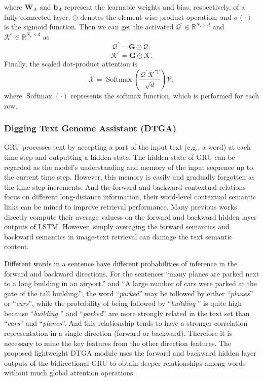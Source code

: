 \documentclass[journal]{IEEEtran}
\begin{document}
where $\bm{W}_A $ and $\bm{b}_A$ represent the learnable weights and bias, respectively, of a fully-connected layer; $\odot$ denotes the element-wise product operation; and $\sigma \left(\cdot \right)$ is the sigmoid function. Then we can get the activated $\bm{\mathcal{Q}}^{\prime} \in \mathbb{R}^{N_c \times d}$ and $\bm{\mathcal{K}}^{\prime} \in \mathbb{R}^{N_c \times d}$ as
\begin{equation}
\bm{\mathcal{Q}}^{\prime}=\bm{G} \odot \bm{\mathcal{Q}},
\end{equation}
\begin{equation}
\bm{\mathcal{K}}^{\prime}= \bm{G} \odot \bm{\mathcal{K}}.
\end{equation}
Finally, the scaled dot-product attention is
\begin{equation}
\tilde{\bm{\mathcal{X}}} =\operatorname{Softmax}\left(\frac{\bm{\mathcal{Q}}^{\prime} \bm{\mathcal{K}}^{\prime \mathrm{T}}}{\sqrt{d}}\right) \bm{\mathcal{V}},
\end{equation}
where $\operatorname{Softmax}\left(\cdot \right)$ represents the softmax function, which is performed for each row.
\subsubsection{Digging Text Genome Assistant (DTGA)}
GRU \cite{chung2014empirical} processes text by accepting a part of the input text (e.g., a word) at each time step and outputting a hidden state. The hidden state of GRU can be regarded as the model's understanding and memory of the input sequence up to the current time step. However, this memory is easily and gradually forgotten as the time step increments. And the forward and backward contextual relations focus on different long-distance information, their word-level contextual semantic links can be mined to improve retrieval performance. Many previous works \cite{ji2019saliency, zhang2020context, yuan2022remote, zhang2023hypersphere} directly compute their average valuess on the forward and backward hidden layer outputs of LSTM. However, simply averaging the forward semantics and backward semantics in image-text retrieval can damage the text semantic content.

Different words in a sentence have different probabilities of inference in the forward and backward directions. For the sentences ``many planes are parked next to a long building in an airport.'' and ``A large number of cars were parked at the gate of the tall building.'', the word ``\emph{parked}'' may be followed by either ``\emph{planes}'' or ``\emph{cars}'', while the probability of being followed by ``\emph{building} '' is quite high because ``\emph{building} '' and ``\emph{parked}'' are more strongly related in the text set than ``\emph{cars}'' and ``\emph{planes}''. And this relationship tends to have a stronger correlation representation in a single direction (forward or backward). Therefore it is necessary to mine the key features from the other direction features. The proposed lightweight DTGA module uses the forward and backward hidden layer outputs of the bidirectional GRU to obtain deeper relationships among words without much global attention operations. 
\end{document}
